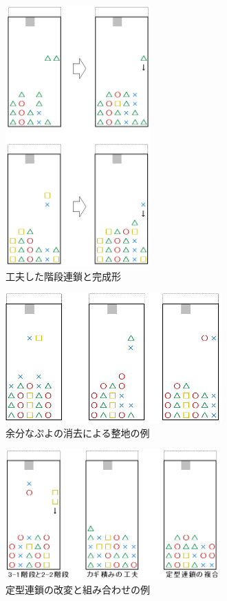 \documentclass[12pt]{jsarticle}
\begin{document}
\begin{figure}[hbt]
  \begin{center}
  \includegraphics[height=10cm]{img/kaidan_ok.png}
  \caption{工夫した階段連鎖と完成形} \label{fig:kaidan_ok}
\end{center}
\end{figure}

\begin{figure}[hbt]
  \begin{center}
  \includegraphics[height=5cm]{img/teikei_del.png}
  \caption{余分なぷよの消去による整地の例} \label{fig:teikei_del}
\end{center}
\end{figure}

\begin{figure}[hbt]
  \begin{center}
  \includegraphics[height=5cm]{img/teikei_combi.png}
  \caption{定型連鎖の改変と組み合わせの例} \label{fig:teikei_combi}
\end{center}
\end{figure}
\end{document}
